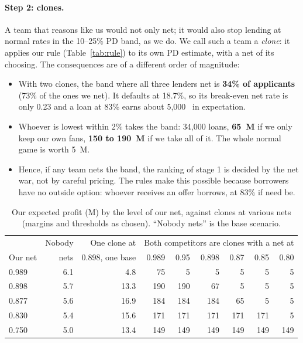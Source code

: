 \documentclass[11pt,a4paper]{article}
\newcommand{\meur}{M\texteuro}
\begin{document}
\paragraph{Step 2: clones.} A team that reasons like us would not only net; it would also stop lending at
normal rates in the 10--25\% PD band, as we do. We call such a team a \emph{clone}: it applies our rule
(Table~\ref{tab:rule}) to its own PD estimate, with a net of its choosing. The consequences are of a different
order of magnitude:
\begin{itemize}
  \item With two clones, the band where all three lenders net is \textbf{34\% of applicants} (73\% of the ones we
        net). It defaults at 18.7\%, so its break-even net rate is only 0.23 and a loan at 83\% earns about
        5,000~\texteuro{} in expectation.
  \item Whoever is lowest within 2\% takes the band: 34,000 loans, \textbf{65~\meur{}} if we only keep our own
        fans, \textbf{150 to 190~\meur{}} if we take all of it. The whole normal game is worth 5~\meur{}.
  \item Hence, if any team nets the band, the ranking of stage 1 is decided by the net war, not by careful
        pricing. The rules make this possible because borrowers have no outside option: whoever receives an offer
        borrows, at 83\% if need be.
\end{itemize}

\begin{table}[h]\centering\footnotesize
\begin{tabular}{lrr@{\hskip 0.8cm}rrrrrr}
\toprule
 & Nobody & One clone at & \multicolumn{6}{c}{Both competitors are clones with a net at}\\
Our net & nets & 0.898, one base & 0.989 & 0.95 & 0.898 & 0.87 & 0.85 & 0.80\\
\midrule
0.989 & 6.1 &  4.8 &  75 &   5 &   5 &   5 &   5 &   5\\
0.898 & 5.7 & 13.3 & 190 & 190 &  67 &   5 &   5 &   5\\
0.877 & 5.6 & 16.9 & 184 & 184 & 184 &  65 &   5 &   5\\
0.830 & 5.4 & 15.6 & 171 & 171 & 171 & 171 & 171 &   5\\
0.750 & 5.0 & 13.4 & 149 & 149 & 149 & 149 & 149 & 149\\
\bottomrule
\end{tabular}
\caption{Our expected profit (\meur{}) by the level of our net, against clones at various nets (margins and
thresholds as chosen). ``Nobody nets'' is the base scenario.}
\label{tab:clones}
\end{table}
\end{document}
